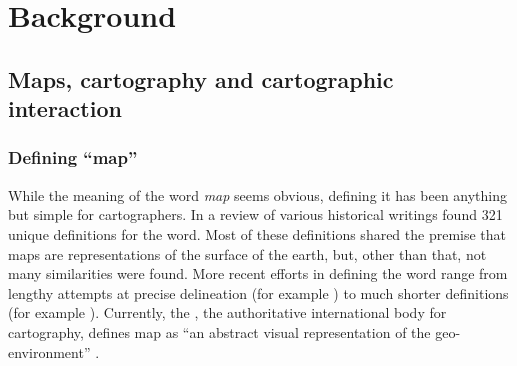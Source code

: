 \section{Background}



\subsection{Maps, cartography and cartographic interaction}

\subsubsection{Defining \enquote{map}}
While the meaning of the word \textit{map} seems obvious,
defining it has been anything but simple for cartographers.
In a review of various historical writings \textcite{and1996}
found 321 unique definitions for the word.
Most of these definitions shared the premise that
maps are representations of the surface of the earth,
but, other than that, not many similarities were found.
More recent efforts in defining the word range
from lengthy attempts at precise delineation
(for example \textcite{ica2003})
to much shorter definitions (for example \textcite{kra2017}).
Currently, the ,
the authoritative international body for cartography,
defines map as \enquote{an abstract visual representation of the geo-environment}
\parencite{ica2019}.

